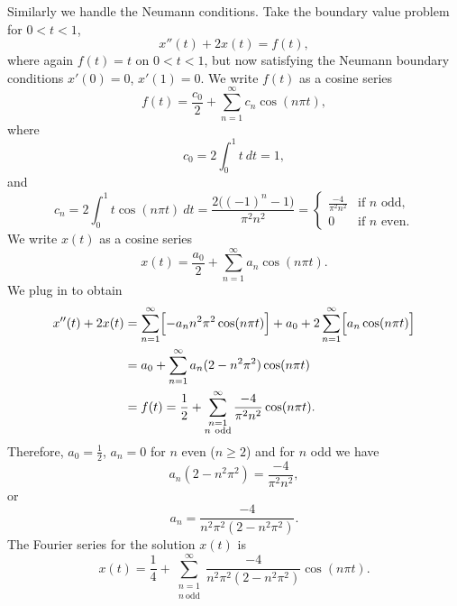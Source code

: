 \pagebreak[2]
\begin{example}
Similarly we handle the Neumann conditions.
Take the boundary value problem for $0 < t < 1$,
\begin{equation*}
x''(t) + 2 x(t) = f(t) ,
\end{equation*}
where again $f(t) = t$ on $0 < t < 1$, but now satisfying
the Neumann boundary conditions
$x'(0) = 0$, $x'(1)=0$.
We write $f(t)$ as a cosine series
\begin{equation*}
f(t) = \frac{c_0}{2} + \sum_{n=1}^\infty c_n \cos (n \pi t) ,
\end{equation*}
where
\begin{equation*}
c_0 = 2 \int_0^1 t ~dt = 1 ,
\end{equation*}
and
\begin{equation*}
c_n = 2 \int_0^1 t \cos (n \pi t) ~dt =
\frac{2\bigl({(-1)}^n-1\bigr)}{\pi^2 n^2} = 
\begin{cases}
\frac{-4}{\pi^2 n^2} & \text{if } n \text{ odd} , \\
0 & \text{if } n \text{ even}.
\end{cases}
\end{equation*}
We write $x(t)$ as a cosine series
\begin{equation*}
x(t) = \frac{a_0}{2} + \sum_{n=1}^\infty a_n \cos (n \pi t) .
\end{equation*}
We plug in to obtain 
\begin{equation*}
\begin{split}
x''(t) + 2 x(t) & =
\sum_{n=1}^\infty \Bigl[ - a_n n^2 \pi^2 \cos (n \pi t) \Bigr]
+
a_0 +
2
\sum_{n=1}^\infty \Bigl[ a_n \cos (n \pi t) \Bigr]
\\
& =
a_0 +
\sum_{n=1}^\infty a_n (2 - n^2 \pi^2 ) \cos (n \pi t)
\\
& = f(t)
=
\frac{1}{2} +
\sum_{\substack{n=1\\n~\text{odd}}}^\infty
\frac{-4}{\pi^2 n^2} \cos (n \pi t) .
\end{split}
\end{equation*}
Therefore, $a_0 = \frac{1}{2}$, $a_n = 0$ for $n$ even ($n \geq 2$) and for
$n$ odd we have
\begin{equation*}
a_n (2 - n^2 \pi^2)
=
\frac{-4}{\pi^2 n^2} ,
\end{equation*}
or
\begin{equation*}
a_n
=
\frac{-4}{n^2 \pi^2 (2 - n^2 \pi^2)} .
\end{equation*}
The Fourier series for the solution $x(t)$ is
\begin{equation*}
x(t) = 
\frac{1}{4} +
\sum_{\substack{n=1\\n~\text{odd}}}^\infty
\frac{-4}{n^2 \pi^2 (2 - n^2 \pi^2)} 
\cos (n \pi t) .
\end{equation*}
\end{example}

